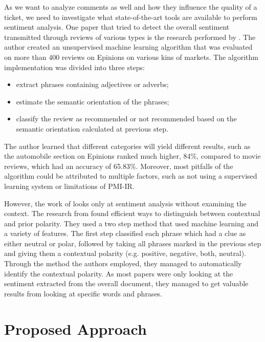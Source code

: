 \documentclass{mprop}
\begin{document}
As we want to analyze comments as well and how they influence the quality of a ticket, we
need to investigate what state-of-the-art tools are available to perform sentiment analysis.
One paper that tried to detect the overall sentiment transmitted through reviews of various 
types is the research performed by \citet{turney2002thumbs}. The author created an unsupervised
machine learning algorithm that was evaluated on more than 400 reviews on Epinions on various
kins of markets. The algorithm implementation was divided into three steps:
  \begin{itemize}
    \item extract phrases containing adjectives or adverbs;
    \item estimate the semantic orientation of the phrases;
    \item classify the review as recommended or not recommended based on
      the semantic orientation calculated at previous step.
  \end{itemize}
The author learned that different categories will yield different results, such as the
automobile section on Epinions ranked much higher, 84\%, compared to movie reviews, which
had an accuracy of 65.83\%. Moreover, most pitfalls of the algorithm could be attributed
to multiple factors, such as not using a supervised learning system or limitations of 
PMI-IR.

However, the work of \citet{turney2002thumbs} looks only at sentiment analysis without
examining the context. The research from \citet{wilson2005recognizing} found
efficient ways to distinguish between contextual and prior polarity. They used a two 
step method that used machine learning and a variety of features. The first step 
classified each phrase which had a clue as either neutral or polar, followed by 
taking all phrases marked in the previous step and giving them a contextual polarity 
(e.g. positive, negative, both, neutral). Through the method the authors employed,
they managed to automatically identify the contextual polarity. As most papers were only
looking at the sentiment extracted from the overall document, they managed to get 
valuable results from looking at specific words and phrases.

\section{Proposed Approach}\label{proposed_approach}
\end{document}
